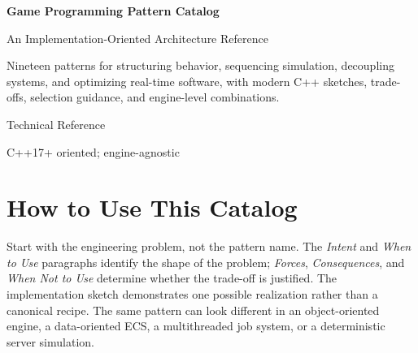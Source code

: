 \documentclass[11pt]{article}
\begin{document}
\hypersetup{pageanchor=false}
\begin{titlepage}
\centering
\vspace*{1.2in}
{\Huge\bfseries\color{navy} Game Programming Pattern Catalog\par}
\vspace{0.3in}
{\Large An Implementation-Oriented Architecture Reference\par}
\vspace{0.55in}
\begin{tcolorbox}[colback=lightblue,colframe=navy,width=0.88\textwidth]
\centering
Nineteen patterns for structuring behavior, sequencing simulation, decoupling systems, and optimizing real-time software, with modern C++ sketches, trade-offs, selection guidance, and engine-level combinations.
\end{tcolorbox}
\vfill
{\large Technical Reference\par}
\vspace{0.1in}
{\normalsize C++17+ oriented; engine-agnostic\par}
\end{titlepage}
\hypersetup{pageanchor=true}

\begin{abstract}
This catalog presents a compact but engineering-focused pattern language for real-time game software. The emphasis is not on pattern names as ends in themselves, but on the forces that make a pattern useful: changeability, timing, lifetime, communication, memory layout, and performance. Each pattern is documented with a uniform decision structure, a modern implementation sketch, failure modes, and explicit relationships to neighboring patterns. The final sections provide selection tables, sparse relationship and trade-off matrices, common combinations, and practical architecture examples.
\end{abstract}

\tableofcontents
\clearpage

\section{How to Use This Catalog}\label{sec:how-to-use}
Start with the engineering problem, not the pattern name. The \emph{Intent} and \emph{When to Use} paragraphs identify the shape of the problem; \emph{Forces}, \emph{Consequences}, and \emph{When Not to Use} determine whether the trade-off is justified. The implementation sketch demonstrates one possible realization rather than a canonical recipe. The same pattern can look different in an object-oriented engine, a data-oriented ECS, a multithreaded job system, or a deterministic server simulation.
\end{document}
